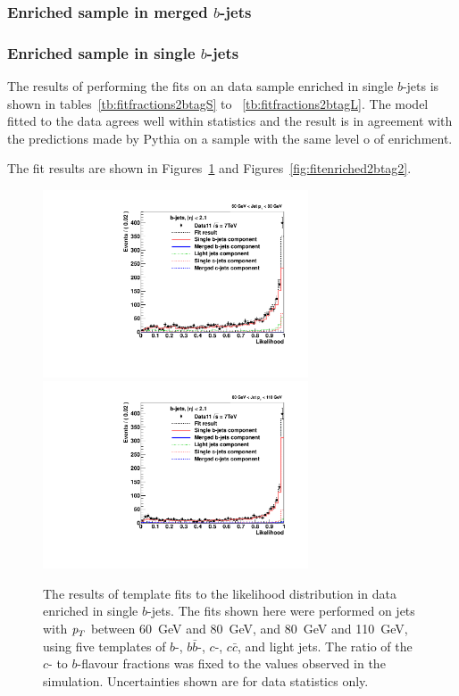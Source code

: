 \subsubsection{Enriched sample in merged $b$-jets}



\subsubsection{Enriched sample in single $b$-jets}

The results of performing the fits on an data sample enriched in single $b$-jets is shown in tables~\ref{tb:fitfractions2btagS} to ~\ref{tb:fitfractions2btagL}. The model fitted to the data agrees well within statistics %
and the result is in agreement with the predictions made by {\sc Pythia} on a sample with the same level o of enrichment.  %


The fit results are shown in Figures~\ref{fig:fitenriched2btag1} and Figures~\ref{fig:fitenriched2btag2}.


\begin{figure}[tp]
\centering
\includegraphics[width=0.7\textwidth]{FIGS/Fits/LikelihoodFit_3param_ETAFull_DataEnriched2btag_Bin1.pdf}
\includegraphics[width=0.7\textwidth]{FIGS/Fits/LikelihoodFit_3param_ETAFull_DataEnriched2btag_Bin2.pdf}
\caption{The results of template fits to the likelihood distribution in data enriched in single $b$-jets. The fits shown here were performed on jets with ${\emph{p}_{T}}$ between  60~GeV and 80~GeV, and 80~GeV and 110~GeV, using five templates of $b$-, $b\bar{b}$-, $c$-, $c\bar{c}$, and light jets.  The ratio of the $c$- to $b$-flavour fractions was fixed to the values observed in the simulation.  Uncertainties shown are for data statistics only.}
\label{fig:fitenriched2btag1}
\end{figure}



